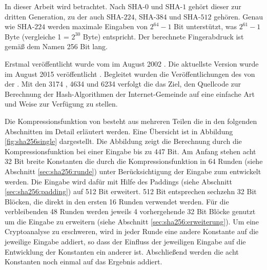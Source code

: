 In dieser Arbeit wird  betrachtet. Nach SHA-$0$ und SHA-$1$ gehört dieser zur dritten Generation, zu der auch SHA-$224$, SHA-$384$ und SHA-$512$ gehören.
Genau wie SHA-$224$ werden maximale Eingaben von $ 2^{64} - 1$ Bit unterstützt, was $ 2^{61} - 1 $ Byte (vergleiche 1  = $ 2^{30} $ Byte) entspricht.
Der berechnete Fingerabdruck ist gemäß dem Namen 256 Bit lang.

Erstmal veröffentlicht wurde  vom  im August 2002 \cite{nist1802}. Die aktuellste Version wurde im August 2015 veröffentlicht \cite{nist1804}.
Begleitet wurden die Veröffentlichungen des  von der . Mit den  3174 \cite{rfc3174}, 4634 \cite{rfc4634} und 6234 \cite{rfc6234}
verfolgt die  das Ziel, den Quellcode zur Berechnung der Hash-Algorithmen der Internet-Gemeinde auf eine einfache Art und Weise zur Verfügung zu stellen.

Die Kompressionsfunktion von  besteht aus mehreren Teilen die in den folgenden Abschnitten im Detail erläutert werden. Eine Übersicht ist in Abbildung
\ref{fig:sha256single} dargestellt. Die Abbildung zeigt die Berechnung durch die Kompressionsfunktion bei einer Eingabe bis zu 447 Bit. Am Anfang stehen acht
32 Bit breite Konstanten die durch die Kompressionsfunktion in 64 Runden (siehe Abschnitt \ref{sec:sha256:runde}) unter Berücksichtigung der Eingabe zum 
entwickelt werden. Die Eingabe wird dafür mit Hilfe des Paddings (siehe Abschnitt \ref{sec:sha256:padding}) auf 512 Bit erweitert. 512 Bit entsprechen sechzehn
32 Bit Blöcken, die direkt in den ersten 16 Runden verwendet werden. Für die verbleibenden 48 Runden werden jeweils 4 vorhergehende 32 Bit Blöcke genutzt um die
Eingabe zu erweitern (siehe Abschnitt \ref{sec:sha256:erweiterung}). Um eine Cryptoanalyse zu erschweren, wird in jeder Runde eine andere Konstante auf die
jeweilige Eingabe addiert, so dass der Einfluss der jeweiligen Eingabe auf die Entwicklung der Konstanten ein anderer ist. Abschließend werden die acht Konstanten
noch einmal auf das Ergebnis addiert.

